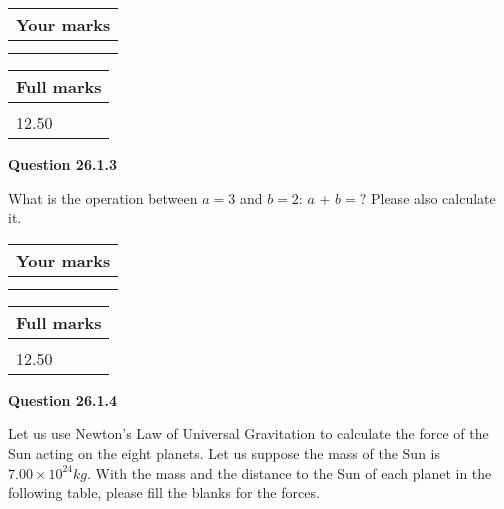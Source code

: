 \documentclass[12pt]{article}
\begin{document}
         \begin{tabular}{|l|}
\hline
 Your marks  \\
\hline
 \\ 
 \\ 
\hline
\end{tabular}
\hspace{0.05in} \begin{tabular}{|l|}
\hline
 Full marks  \\
\hline
 \\ 
12.50 \\
\hline
\end{tabular}
{\textbf{\Large{Question
26.1.3 
}}}
  
  
What is the operation between $a= %
3$ and $b= %
2$:
$a$  %
$+$ $b=?$ Please also calculate it.

 
\vspace{0.3in}
  
\vspace{0.2in}
  
         \begin{tabular}{|l|}
\hline
 Your marks  \\
\hline
 \\ 
 \\ 
\hline
\end{tabular}
\hspace{0.05in} \begin{tabular}{|l|}
\hline
 Full marks  \\
\hline
 \\ 
12.50 \\
\hline
\end{tabular}
{\textbf{\Large{Question
26.1.4 
}}}
  
  
Let us use Newton's Law of Universal Gravitation to calculate the force
of the Sun acting on the eight planets. Let us suppose the mass of the
Sun is $ %
7.00 \times 10^{24} kg$. With the mass and the
distance to the Sun of each planet in the following table, please fill
the blanks for the forces.
 
\vspace{0.2in}
 
\end{document}

